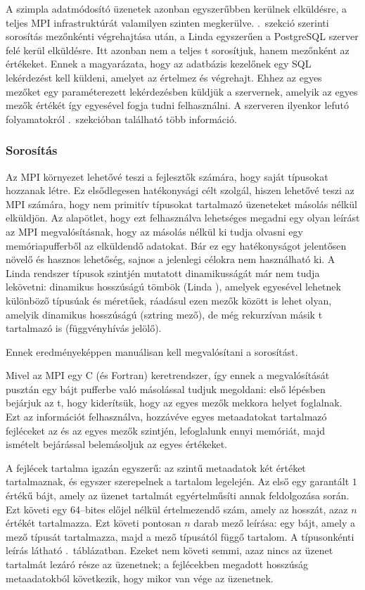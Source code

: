 A szimpla adatmódosító üzenetek azonban egyszerűbben kerülnek elküldésre, a teljes MPI infrastruktúrát valamilyen szinten megkerülve.
.~szekció szerinti sorosítás mezőnkénti végrehajtása után, a Linda \nes{} egyszerűen a \mbox{PostgreSQL} szerver felé kerül elküldésre.
Itt azonban nem a teljes \nes{}t sorosítjuk, hanem mezőnként az értékeket.
Ennek a magyarázata, hogy az adatbázis kezelőnek egy SQL lekérdezést kell küldeni, amelyet az értelmez és végrehajt.
Ehhez az egyes mezőket egy paraméterezett lekérdezésben küldjük a szervernek, amelyik az egyes mezők értékét így egyesével fogja tudni felhasználni.
A szerveren ilyenkor lefutó folyamatokról .~szekcióban található több információ.

\subsubsection{Sorosítás}\label{subsubsec:serial}

Az MPI környezet lehetővé teszi a fejlesztők számára, hogy saját típusokat hozzanak létre.
Ez elsődlegesen hatékonysági célt szolgál, hiszen lehetővé teszi az MPI számára, hogy nem primitív típusokat tartalmazó üzeneteket másolás nélkül elküldjön.
Az alapötlet, hogy ezt felhasználva lehetséges megadni egy olyan leírást az MPI megvalósításnak, hogy az másolás nélkül ki tudja olvasni egy memóriapufferből az elküldendő adatokat.
Bár ez egy hatékonyságot jelentősen növelő és hasznos lehetőség, sajnos a jelenlegi célokra nem használható ki.
A Linda rendszer típusok szintjén mutatott dinamikusságát már nem tudja lekövetni: dinamikus hosszúságú tömbök (Linda \nes{}), amelyek egyesével lehetnek különböző típusúak és méretűek, ráadásul ezen mezők között is lehet olyan, amelyik dinamikus hosszúságú (sztring mező), de még rekurzívan másik \nes{}t tartalmazó is (függvényhívás jelölő).

Ennek eredményeképpen manuálisan kell megvalósítani a sorosítást.

Mivel az MPI egy C (és Fortran) keretrendszer, így ennek a megvalósítását pusztán egy bájt pufferbe való másolással tudjuk megoldani: első lépésben bejárjuk az \nes{}t, hogy kiderítsük, hogy az egyes mezők mekkora helyet foglalnak.
Ezt az információt felhasználva, hozzávéve egyes metaadatokat tartalmazó fejléceket az \nes{} és az egyes mezők szintjén, lefoglalunk ennyi memóriát, majd ismételt bejárással belemásoljuk az egyes értékeket.

A fejlécek tartalma igazán egyszerű: az \nes{} szintű metaadatok két értéket tartalmaznak, és egyszer szerepelnek a tartalom legelején.
Az első egy garantált $1$ értékű bájt, amely az üzenet tartalmát egyértelműsíti annak feldolgozása során.
Ezt követi egy 64--bites előjel nélkül értelmezendő szám, amely az \nes{} hosszát, azaz $n$ értékét tartalmazza.
Ezt követi pontosan $n$ darab mező leírása: egy bájt, amely a mező típusát tartalmazza, majd a mező típusától függő tartalom.
A típusonkénti leírás látható .~táblázatban.
Ezeket nem követi semmi, azaz nincs az üzenet tartalmát lezáró része az üzenetnek; a fejlécekben megadott hosszúság metaadatokból következik, hogy mikor van vége az üzenetnek.

